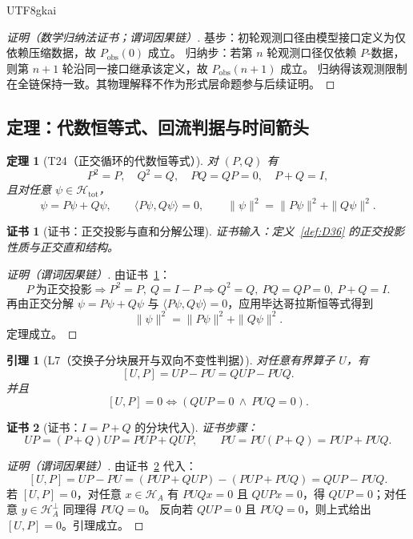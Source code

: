 \documentclass[12pt]{article}
\newtheorem{theorem}{定理}[section]
\newtheorem{lemma}{引理}[section]
\newtheorem{Certificate}{证书}[section]
\begin{document}
\begin{CJK*}{UTF8}{gkai}
\begin{proof}[证明（数学归纳法证书；谓词因果链）]
基步：初轮观测口径由模型接口定义为仅依赖压缩数据，故 $P_{\mathrm{obs}}(0)$ 成立。
归纳步：若第 $n$ 轮观测口径仅依赖 $P$-数据，则第 $n+1$ 轮沿同一接口继承该定义，故 $P_{\mathrm{obs}}(n+1)$ 成立。
归纳得该观测限制在全链保持一致。其物理解释不作为形式层命题参与后续证明。
\end{proof}

\subsection{定理：代数恒等式、回流判据与时间箭头}

\begin{theorem}[T24（正交循环的代数恒等式）]
\label{thm:T24}
对 $(P,Q)$ 有
\[
P^2=P,\quad Q^2=Q,\quad PQ=QP=0,\quad P+Q=I,
\]
且对任意 $\psi\in\mathcal H_{\mathrm{tot}}$，
\[
\psi=P\psi+Q\psi,\qquad \langle P\psi,Q\psi\rangle=0,\qquad \|\psi\|^2=\|P\psi\|^2+\|Q\psi\|^2.
\]
\end{theorem}

\begin{Certificate}[证书：正交投影与直和分解公理]
\label{cert:T24}
证书输入：定义~\ref{def:D36} 的正交投影性质与正交直和结构。
\end{Certificate}

\begin{proof}[证明（谓词因果链）]
由证书~\ref{cert:T24}：
\[
P\ \text{为正交投影}\Rightarrow P^2=P,\ Q=I-P\Rightarrow Q^2=Q,\ PQ=QP=0,\ P+Q=I.
\]
再由正交分解 $\psi=P\psi+Q\psi$ 与 $\langle P\psi,Q\psi\rangle=0$，应用毕达哥拉斯恒等式得到
\[
\|\psi\|^2=\|P\psi\|^2+\|Q\psi\|^2.
\]
定理成立。
\end{proof}

\begin{lemma}[L7（交换子分块展开与双向不变性判据）]
\label{lem:L7}
对任意有界算子 $U$，有
\[
[U,P]=UP-PU=QUP-PUQ.
\]
并且
\[
[U,P]=0\Longleftrightarrow (QUP=0\ \wedge\ PUQ=0).
\]
\end{lemma}

\begin{Certificate}[证书：$I=P+Q$ 的分块代入]
\label{cert:L7}
证书步骤：
\[
UP=(P+Q)UP=PUP+QUP,\qquad
PU=PU(P+Q)=PUP+PUQ.
\]
\end{Certificate}

\begin{proof}[证明（谓词因果链）]
由证书~\ref{cert:L7} 代入：
\[
[U,P]=UP-PU=(PUP+QUP)-(PUP+PUQ)=QUP-PUQ.
\]
若 $[U,P]=0$，对任意 $x\in\mathcal H_A$ 有 $PUQx=0$ 且 $QUPx=0$，得 $QUP=0$；对任意 $y\in\mathcal H_A^\perp$ 同理得 $PUQ=0$。
反向若 $QUP=0$ 且 $PUQ=0$，则上式给出 $[U,P]=0$。引理成立。
\end{proof}


\end{CJK*}
\end{document}
